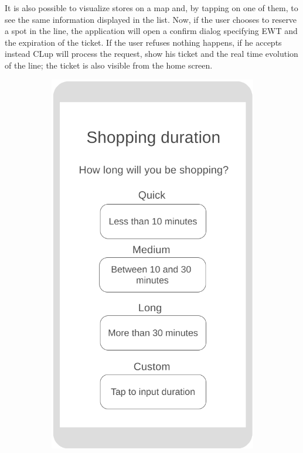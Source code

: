 It is also possible to visualize stores on a map and, by tapping on one of them, to see the same information displayed in the list. Now, if the user chooses to reserve a spot in the line, the application will open a confirm dialog specifying EWT and the expiration of the ticket. If the user refuses nothing happens, if he accepts instead CLup will process the request, show his ticket and the real time evolution of the line; the ticket is also visible from the home screen.\\
\begin{figure}[h!]
	\centering
	\begin{subfigure}[b]{0.3\textwidth}
		\includegraphics[width=\linewidth]{../Diagrams/WireframesCLup/ShoppingTime.png}

\end{subfigure}
\end{figure}
